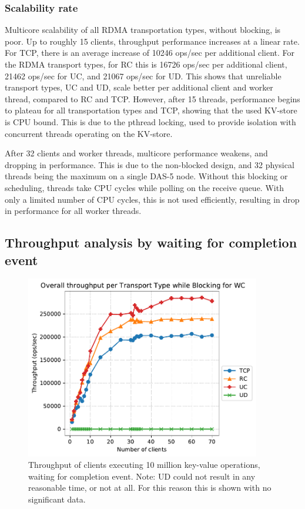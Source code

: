 \subsubsection{Scalability rate}\label{subsec:scalability-rate}
Multicore scalability of all RDMA transportation types, without blocking, is poor.
Up to roughly 15 clients, throughput performance increases at a linear rate.
For TCP, there is an average increase of 10246 ops/sec per additional client.
For the RDMA transport types, for RC this is 16726 ops/sec per additional client, 21462 ops/sec for UC, and 21067 ops/sec for UD.
This shows that unreliable transport types, UC and UD, scale better per additional client and worker thread, compared to RC and TCP.
However, after 15 threads, performance begins to plateau for all transportation types and TCP, showing that the used KV-store is CPU bound.
This is due to the pthread locking, used to provide isolation with concurrent threads operating on the KV-store.

After 32 clients and worker threads, multicore performance weakens, and dropping in performance.
This is due to the non-blocked design, and 32 physical threads being the maximum on a single DAS-5 node.
Without this blocking or scheduling, threads take CPU cycles while polling on the receive queue.
With only a limited number of CPU cycles, this is not used efficiently, resulting in drop in performance for all worker threads.

\subsection{Throughput analysis by waiting for completion event}
\begin{figure}
    \centering
    \includegraphics[height=8cm]{figures/PDF/Throughput_70_blocking}
    \caption[Throughput of clients executing 10 million key-value operations, waiting for completion event.]{Throughput of clients executing 10 million key-value operations, waiting for completion event. Note: UD could not result in any reasonable time, or not at all. For this reason this is shown with no significant data.}
    \label{fig:throughput-70-block}
\end{figure}

